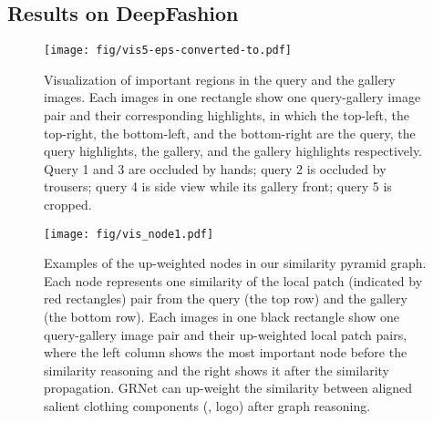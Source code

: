 \documentclass[10pt,twocolumn,letterpaper]{article}
\begin{document}
\subsection{Results on DeepFashion~\cite{Liu2016}}

\begin{figure*}[!t]
\centering
\texttt{[image: fig/vis5-eps-converted-to.pdf]}
\caption{Visualization of important regions in the query and the gallery images. Each  images in one rectangle show one query-gallery image pair and their corresponding highlights, in which the top-left, the top-right, the bottom-left, and the bottom-right are the query, the query highlights, the gallery, and the gallery highlights respectively. Query 1 and 3 are occluded by hands; query 2 is occluded by trousers; query 4 is side view while its gallery front; query 5 is cropped.}
\label{fig:fig_vis_loc}
\vspace{-2mm}
\end{figure*}

\begin{figure}[!b]
\centering
\texttt{[image: fig/vis\_node1.pdf]}
\caption{Examples of the up-weighted nodes in our similarity pyramid graph. Each node represents one similarity of the local patch (indicated by red rectangles) pair from the query (the top row) and the gallery (the bottom row).     Each  images in one black rectangle show one query-gallery image pair and their up-weighted local patch pairs, where the left column shows the most important node before the similarity reasoning and the right shows it after the similarity propagation. GRNet can up-weight  the similarity between aligned salient clothing components (\eg, logo) after graph reasoning. }
\label{fig:fig_vis_patch}
\vspace{-5mm}
\end{figure}
\end{document}

